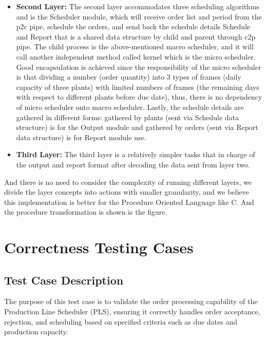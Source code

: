 \documentclass[conference]{IEEEtran}
\begin{document}
\begin{itemize}
    \item \textbf{Second Layer: } The second layer accommodates three scheduling algorithms and is the Scheduler module, which will receive order list and period from the p2c pipe, schedule the orders, and send back the schedule details Schedule and Report that is a shared data structure by child and parent through c2p pipe. The child process is the above-mentioned macro scheduler, and it will call another independent method called kernel which is the micro scheduler. Good  encapsulation is achieved since the responsibility of the micro scheduler is that dividing a number (order quantity) into 3 types of frames (daily capacity of three plants) with limited numbers of frames (the remaining days with respect to different plants before due date), thus, there is no dependency of micro scheduler onto macro scheduler.  Lastly, the schedule details are gathered in different forms: gathered by plants (sent via Schedule data structure) is for the Output module and gathered by orders (sent via Report data structure) is for Report module use.
\end{itemize}

\begin{itemize}
    \item \textbf{Third Layer: } The third layer is a relatively simpler tasks that in charge of the output and report format after decoding the data sent from layer two. 
\end{itemize}
And there is no need to consider the complexity of running different layers, we divide the layer concepts into actions with smaller granularity, and we believe this implementation is better for the Procedure Oriented Language like C. And the procedure transformation is shown is the figure.

\section{\textbf{Correctness Testing Cases}}
\subsection{Test Case Description}
The purpose of this test case is to validate the order processing capability of the Production Line Scheduler (PLS), ensuring it correctly handles order acceptance, rejection, and scheduling based on specified criteria such as due dates and production capacity.
\end{document}
